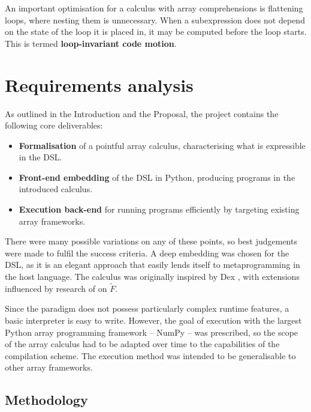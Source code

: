 An important optimisation for a calculus with array comprehensions is flattening loops, where nesting them is unnecessary. When a subexpression does not depend on the state of the loop it is placed in, it may be computed before the loop starts. This is termed \textbf{loop-invariant code motion}.

\section{Requirements analysis}
\label{requirements-analysis}

As outlined in the Introduction and the Proposal, the project contains the following core deliverables:
\begin{itemize}
    \item \textbf{Formalisation} of a pointful array calculus, characterising what is expressible in the DSL.
    \item \textbf{Front-end embedding} of the DSL in Python, producing programs in the introduced calculus.
    \item \textbf{Execution back-end} for running programs efficiently by targeting existing array frameworks.
\end{itemize}
There were many possible variations on any of these points, so best judgements were made to fulfil the success criteria. A deep embedding was chosen for the DSL, as it is an elegant approach that easily lends itself to metaprogramming in the host language. 
The calculus was originally inspired by Dex \cite{paszke2021getting}, with extensions influenced by research of \textcite{shaikhha2019efficient} on $\tilde F$. 

Since the paradigm does not possess particularly complex runtime features, a basic interpreter is easy to write. However, the goal of execution with the largest Python array programming framework -- NumPy -- was prescribed, so the scope of the array calculus had to be adapted over time to the capabilities of the compilation scheme. The execution method was intended to be generalisable to other array frameworks.

\subsection{Methodology}

